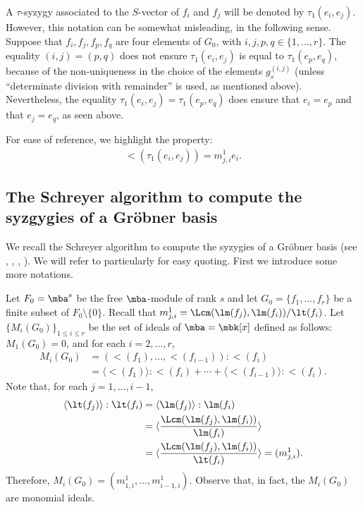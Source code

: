 \begin{discussion}
A $\tau$-syzygy associated to the $S$-vector of $f_i$ and $f_j$ will
be denoted by $\tau_1(e_i,e_j)$. However, this notation can be
somewhat misleading, in the following sense. Suppose that
$f_{i},f_{j},f_{p},f_{q}$ are four elements of $G_0$, with
$i,j,p,q\in\{1,\ldots ,r\}$. The equality $(i,j)=(p,q)$ does not
ensure $\tau_1(e_i,e_j)$ is equal to $\tau_1(e_p,e_q)$, because of the
non-uniqueness in the choice of the elements $g_s^{(i,j)}$ (unless
``determinate division with remainder'' is used, as mentioned
above). Nevertheless, the equality $\tau_1(e_i,e_j)=\tau_1(e_p,e_q)$
does ensure that $e_i=e_p$ and that $e_j=e_q$, as seen above.

For ease of reference, we highlight the property:
\begin{eqnarray}\label{inducedlm}
\lt(\tau_1(e_i,e_j))=m^1_{j,i}e_i.
\end{eqnarray}
\end{discussion}

\subsection{The Schreyer algorithm to compute
the syzgygies of a Gr\"obner basis}\label{schreyer-alg}

 We recall the Schreyer algorithm to compute the syzygies of
a Gr\"obner basis (see \cite[Theorem~3.2 and Proposition~3.5]{emss},
\cite[Corollary~2.3.19]{ds}, \cite[Corollary~1.11]{bs},
\cite[Theorem~15.10, Corollary~15.11]{eisenbud}).  We will refer to
\cite{emss} particularly for easy quoting. First we introduce some more
notations.

\begin{notation}\label{module-quotients}
Let $F_0=\mba^s$ be the free $\mba$-module of rank $s$ and let
$G_0=\{f_1,\ldots ,f_r\}$ be a finite subset of
$F_0\setminus\{0\}$. Recall that
$m^1_{j,i}=\Lcm(\lm(f_j),\lm(f_i))/\lt(f_i)$.  Let
$\{M_i(G_0)\}_{1\leq i\leq r}$ be the set of ideals of $\mba=\mbk[x]$
defined as follows: $M_1(G_0)=0$, and for each $i=2,\ldots,r$,
\begin{align*}
M_i(G_0)&=(\lt(f_1),\ldots,\lt(f_{i-1})):\lt(f_i)\\
&=  \langle\lt(f_1)\rangle:\lt(f_i)+\cdots+\langle\lt(f_{i-1})\rangle:\lt(f_i).
\end{align*}
Note that, for each $j=1,\ldots, i-1$,
\begin{align*}
\langle \lt(f_j)\rangle: \lt(f_i)&=\langle
  \lm(f_j)\rangle:\lm(f_i)\\
&=\langle  \frac{\Lcm(\lm(f_j),\lm(f_i))}{\lm(f_i)}\rangle\\
&= \langle \frac{\Lcm(\lm(f_j),\lm(f_i))}{\lt(f_i)}\rangle=(m^1_{j,i}).
\end{align*}
Therefore, $M_i(G_0)=(m^1_{1,i},\ldots , m^1_{i-1,i})$. Observe that,
in fact, the $M_i(G_0)$ are monomial ideals.
\end{notation}

